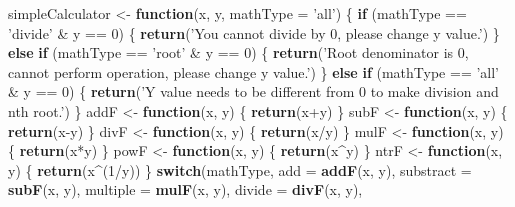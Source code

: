 \documentclass[]{book}
\newenvironment{Shaded}{\begin{snugshade}}{\end{snugshade}}
\newcommand{\KeywordTok}[1]{\textcolor[rgb]{0.12,0.11,0.11}{\textbf{#1}}}
\newcommand{\DataTypeTok}[1]{\textcolor[rgb]{0.00,0.34,0.68}{#1}}
\newcommand{\DecValTok}[1]{\textcolor[rgb]{0.69,0.50,0.00}{#1}}
\newcommand{\StringTok}[1]{\textcolor[rgb]{0.75,0.01,0.01}{#1}}
\newcommand{\ControlFlowTok}[1]{\textcolor[rgb]{0.12,0.11,0.11}{\textbf{#1}}}
\newcommand{\OperatorTok}[1]{\textcolor[rgb]{0.12,0.11,0.11}{#1}}
\newcommand{\NormalTok}[1]{\textcolor[rgb]{0.12,0.11,0.11}{#1}}
\theoremstyle{definition}
\theoremstyle{definition}
\theoremstyle{definition}
\theoremstyle{remark}
\begin{document}
\begin{Shaded}
\begin{Highlighting}[]
\NormalTok{simpleCalculator <-}\StringTok{ }\ControlFlowTok{function}\NormalTok{(x, y, }\DataTypeTok{mathType =} \StringTok{'all'}\NormalTok{) \{}
  \ControlFlowTok{if}\NormalTok{ (mathType }\OperatorTok{==}\StringTok{ 'divide'} \OperatorTok{&}\StringTok{ }\NormalTok{y }\OperatorTok{==}\StringTok{ }\DecValTok{0}\NormalTok{) \{}
    \KeywordTok{return}\NormalTok{(}\StringTok{'You cannot divide by 0, please change y value.'}\NormalTok{)}
\NormalTok{  \} }\ControlFlowTok{else} \ControlFlowTok{if}\NormalTok{ (mathType }\OperatorTok{==}\StringTok{ 'root'} \OperatorTok{&}\StringTok{ }\NormalTok{y }\OperatorTok{==}\StringTok{ }\DecValTok{0}\NormalTok{) \{}
    \KeywordTok{return}\NormalTok{(}\StringTok{'Root denominator is 0, cannot perform operation, please change y value.'}\NormalTok{)}
\NormalTok{  \} }\ControlFlowTok{else} \ControlFlowTok{if}\NormalTok{ (mathType }\OperatorTok{==}\StringTok{ 'all'} \OperatorTok{&}\StringTok{ }\NormalTok{y }\OperatorTok{==}\StringTok{ }\DecValTok{0}\NormalTok{) \{}
    \KeywordTok{return}\NormalTok{(}\StringTok{'Y value needs to be different from 0 to make division and nth root.'}\NormalTok{)}
\NormalTok{  \}}
\NormalTok{  addF <-}\StringTok{ }\ControlFlowTok{function}\NormalTok{(x, y) \{}
  \KeywordTok{return}\NormalTok{(x}\OperatorTok{+}\NormalTok{y)}
\NormalTok{  \}}
\NormalTok{  subF <-}\StringTok{ }\ControlFlowTok{function}\NormalTok{(x, y) \{}
  \KeywordTok{return}\NormalTok{(x}\OperatorTok{-}\NormalTok{y)}
\NormalTok{  \}}
\NormalTok{  divF <-}\StringTok{ }\ControlFlowTok{function}\NormalTok{(x, y) \{}
  \KeywordTok{return}\NormalTok{(x}\OperatorTok{/}\NormalTok{y)}
\NormalTok{  \}}
\NormalTok{  mulF <-}\StringTok{ }\ControlFlowTok{function}\NormalTok{(x, y) \{}
  \KeywordTok{return}\NormalTok{(x}\OperatorTok{*}\NormalTok{y)}
\NormalTok{  \}}
\NormalTok{  powF <-}\StringTok{ }\ControlFlowTok{function}\NormalTok{(x, y) \{}
  \KeywordTok{return}\NormalTok{(x}\OperatorTok{^}\NormalTok{y)}
\NormalTok{  \}}
\NormalTok{  ntrF <-}\StringTok{ }\ControlFlowTok{function}\NormalTok{(x, y) \{}
  \KeywordTok{return}\NormalTok{(x}\OperatorTok{^}\NormalTok{(}\DecValTok{1}\OperatorTok{/}\NormalTok{y))}
\NormalTok{  \}}
  \ControlFlowTok{switch}\NormalTok{(mathType,}
         \DataTypeTok{add =} \KeywordTok{addF}\NormalTok{(x, y),}
         \DataTypeTok{substract =} \KeywordTok{subF}\NormalTok{(x, y),}
         \DataTypeTok{multiple =} \KeywordTok{mulF}\NormalTok{(x, y),}
         \DataTypeTok{divide =} \KeywordTok{divF}\NormalTok{(x, y),}

\end{Highlighting}
\end{Shaded}
\end{document}
